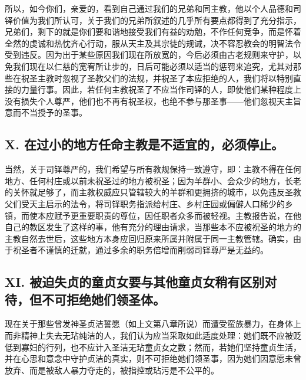 所以，如今你们，亲爱的，看到自己通过我们的兄弟和同主教，他以个人品德和司铎价值为我们所认可，关于我们的兄弟所叙述的几乎所有要点都得到了充分指示，兄弟们，剩下的就是你们要和谐地接受我们有益的劝勉，不作任何竞争，而是怀着全然的虔诚和热忱齐心行动，服从天主及其宗徒的规诫，决不容忍教会的明智法令受到违反。因为出于某些原因我们现在所放宽的，今后必须由古老规则来守护，以免我们现在以仁慈的宽宥所让步的，日后可能必须以适当的惩罚来追究，尤其对那些在祝圣主教时忽视了圣教父们的法规，并祝圣了本应拒绝的人，我们将以特别直接的力量行事。因此，若任何主教祝圣了不应当作司铎的人，即使他们某种程度上没有损失个人尊严，他们也不再有祝圣权，也绝不参与那圣事——他们忽视天主旨意而不当授予的圣事。\par


\subsection{X. 在过小的地方任命主教是不适宜的，必须停止。}

当然，关于司铎尊严的，我们希望与所有教规保持一致遵守，即：主教不得在任何地方、任何村庄或以前未祝圣过的地方被祝圣；因为羊群小、会众少的地方，长老的关怀就足够了，而主教权威应只管辖较大的羊群和更拥挤的城市，以免违反圣教父们受天主启示的法令，将司铎职务指派给村庄、乡村庄园或偏僻人口稀少的乡镇，而使本应赋予更重要职责的尊位，因任职者众多而被轻视。主教报告说，在他自己的教区发生了这样的事，他有充分的理由请求，当那些本不应被祝圣的地方的主教自然去世后，这些地方本身应回归原来所属并附属于同一主教管辖。确实，由于祝圣者不谨慎的迁就，通过多余的职务倍增而削弱司铎尊严是无益的。\par


\subsection{XI. 被迫失贞的童贞女要与其他童贞女稍有区别对待，但不可拒绝她们领圣体。}

现在关于那些曾发神圣贞洁誓愿（如上文第八章所说）而遭受蛮族暴力，在身体上而非精神上失去无玷纯洁的人，我们认为应当采取如此适度处理：她们既不应被贬低到寡妇的行列，也不应计入圣洁无玷童贞女之数；然而，若她们坚持童贞生活，并在心思和意念中守护贞洁的真实，则不可拒绝她们领圣事，因为她们因意愿未曾放弃、而是被敌人暴力夺走的，被指控或玷污是不公平的。\par

